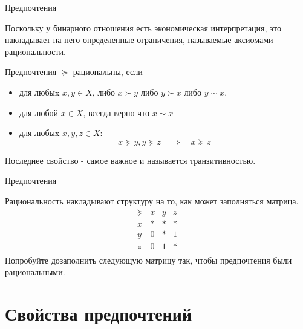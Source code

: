 \documentclass{beamer}
\begin{document}
\begin{frame}{Предпочтения}

Поскольку у бинарного отношения есть экономическая интерпретация, это накладывает на него определенные ограничения, называемые \alert{аксиомами рациональности}.

\begin{definition}
Предпочтения $\succcurlyeq$	\alert{рациональны}, если
\begin{itemize}
\item для любыx $x, y \in X$, либо $x \succ y$ либо $y \succ x$ либо $y \sim x$.
\item для любой $x \in X$, всегда верно что $x \sim x$
\item для любыx $x, y, z \in X$: 
$$x \succcurlyeq y, y \succcurlyeq z \quad \Rightarrow \quad x \succcurlyeq z$$
\end{itemize}
\end{definition}
Последнее свойство - самое важное и называется \alert{транзитивностью}. 

\end{frame}

\begin{frame}{Предпочтения}

Рациональность накладывают структуру на то, как может заполняться матрица. 
$$ 
\begin{array}{c|ccc}
 \succcurlyeq & x & y & z\\
\hline
x & * & * & * \\
y & 0 & * & 1\\
z & 0 & 1 & *\\
\end{array}
$$
Попробуйте дозаполнить следующую матрицу так, чтобы предпочтения были рациональными.

\end{frame}

\section{Свойства предпочтений}
\end{document}

